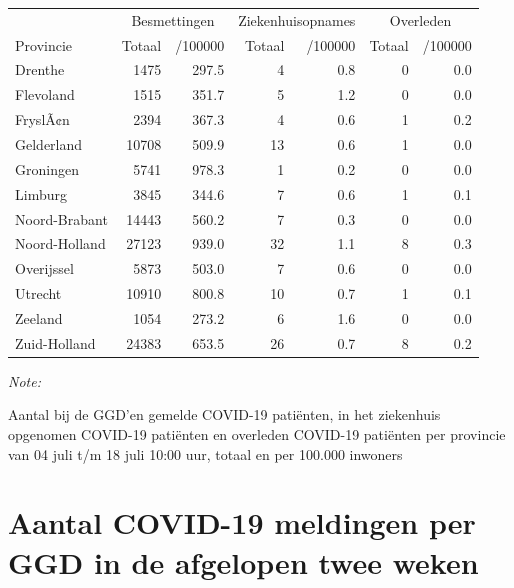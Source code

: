 \documentclass[
  english,
  man,floatsintext]{apa6}
\begin{document}
\begin{table}
\centering
\begin{threeparttable}
\begin{tabular}{lrrrrrr}
\toprule
\multicolumn{1}{c}{ } & \multicolumn{2}{c}{Besmettingen} & \multicolumn{2}{c}{Ziekenhuisopnames} & \multicolumn{2}{c}{Overleden} \\
\cmidrule(l{3pt}r{3pt}){2-3} \cmidrule(l{3pt}r{3pt}){4-5} \cmidrule(l{3pt}r{3pt}){6-7}
Provincie & Totaal & /100000 & Totaal & /100000 & Totaal & /100000\\
\midrule
Drenthe & 1475 & 297.5 & 4 & 0.8 & 0 & 0.0\\
Flevoland & 1515 & 351.7 & 5 & 1.2 & 0 & 0.0\\
FryslÃ¢n & 2394 & 367.3 & 4 & 0.6 & 1 & 0.2\\
Gelderland & 10708 & 509.9 & 13 & 0.6 & 1 & 0.0\\
Groningen & 5741 & 978.3 & 1 & 0.2 & 0 & 0.0\\
Limburg & 3845 & 344.6 & 7 & 0.6 & 1 & 0.1\\
Noord-Brabant & 14443 & 560.2 & 7 & 0.3 & 0 & 0.0\\
Noord-Holland & 27123 & 939.0 & 32 & 1.1 & 8 & 0.3\\
Overijssel & 5873 & 503.0 & 7 & 0.6 & 0 & 0.0\\
Utrecht & 10910 & 800.8 & 10 & 0.7 & 1 & 0.1\\
Zeeland & 1054 & 273.2 & 6 & 1.6 & 0 & 0.0\\
Zuid-Holland & 24383 & 653.5 & 26 & 0.7 & 8 & 0.2\\
\bottomrule
\end{tabular}
\begin{tablenotes}
\item \textit{Note: } 
\item Aantal bij de GGD’en gemelde COVID-19 patiënten, in het ziekenhuis opgenomen COVID-19 patiënten en overleden COVID-19 patiënten per provincie van 04 juli t/m 18 juli 10:00 uur, totaal en per 100.000 inwoners
\end{tablenotes}
\end{threeparttable}
\end{table}

\newpage

\hypertarget{aantal-covid-19-meldingen-per-ggd-in-de-afgelopen-twee-weken}{%
\section{Aantal COVID-19 meldingen per GGD in de afgelopen twee weken}\label{aantal-covid-19-meldingen-per-ggd-in-de-afgelopen-twee-weken}}
\end{document}
